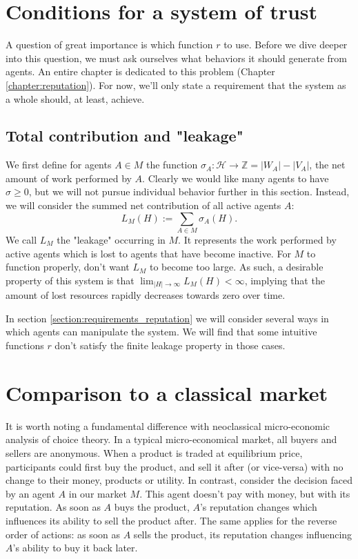 \section{Conditions for a system of trust}
A question of great importance is which function $r$ to use. Before we dive deeper into this question, we must ask ourselves what behaviors it should generate from agents. An entire chapter is dedicated to this problem (Chapter \ref{chapter:reputation}). For now, we'll only state a requirement that the system as a whole should, at least, achieve.

\subsection{Total contribution and "leakage"}
We first define for agents $A \in M$ the function $\sigma_A: \mathcal{H} \to \mathds{Z} = |W_A| - |V_A|$, the net amount of work performed by $A$. Clearly we would like many agents to have $\sigma \geq 0$, but we will not pursue individual behavior further in this section. Instead, we will consider the summed net contribution of all active agents $A$:
\[L_M(H) := \sum_{A \in M} \sigma_A(H).\]
We call $L_M$ the "leakage" occurring in $M$. It represents the work performed by active agents which is lost to agents that have become inactive. For $M$ to function properly, don't want $L_M$ to become too large. As such, a desirable property of this system is that $\lim_{|H| \to \infty} L_M(H) < \infty$, implying that the amount of lost resources rapidly decreases towards zero over time.

In section \ref{section:requirements_reputation} we will consider several ways in which agents can manipulate the system. We will find that some intuitive functions $r$ don't satisfy the finite leakage property in those cases.

\section{Comparison to a classical market}
It is worth noting a fundamental difference with neoclassical micro-economic analysis of choice theory. In a typical micro-economical market, all buyers and sellers are anonymous. When a product is traded at equilibrium price, participants could first buy the product, and sell it after (or vice-versa) with no change to their money, products or utility. In contrast, consider the decision faced by an agent $A$ in our market $M$. This agent doesn't pay with money, but with its reputation. As soon as $A$ buys the product, $A$'s reputation changes which influences its ability to sell the product after. The same applies for the reverse order of actions: as soon as $A$ sells the product, its reputation changes influencing $A$'s ability to buy it back later.
